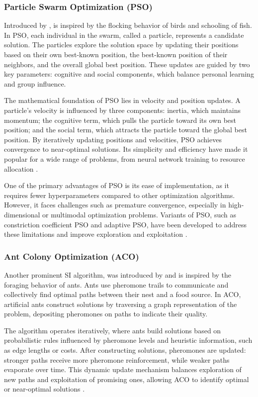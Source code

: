 \subsubsection{Particle Swarm Optimization (PSO)} Introduced by \textcite{kennedy1995particle}, is inspired by the flocking behavior of birds and schooling of fish. In PSO, each individual in the swarm, called a particle, represents a candidate solution. The particles explore the solution space by updating their positions based on their own best-known position, the best-known position of their neighbors, and the overall global best position. These updates are guided by two key parameters: cognitive and social components, which balance personal learning and group influence.

The mathematical foundation of PSO lies in velocity and position updates. A particle's velocity is influenced by three components: inertia, which maintains momentum; the cognitive term, which pulls the particle toward its own best position; and the social term, which attracts the particle toward the global best position. By iteratively updating positions and velocities, PSO achieves convergence to near-optimal solutions. Its simplicity and efficiency have made it popular for a wide range of problems, from neural network training to resource allocation \parencite{clerc2002particle}.

One of the primary advantages of PSO is its ease of implementation, as it requires fewer hyperparameters compared to other optimization algorithms. However, it faces challenges such as premature convergence, especially in high-dimensional or multimodal optimization problems. Variants of PSO, such as constriction coefficient PSO and adaptive PSO, have been developed to address these limitations and improve exploration and exploitation \parencite{shi1998modified}.

\subsubsection{Ant Colony Optimization (ACO)}
Another prominent SI algorithm, was introduced by \textcite{dorigo1996ant} and is inspired by the foraging behavior of ants. Ants use pheromone trails to communicate and collectively find optimal paths between their nest and a food source. In ACO, artificial ants construct solutions by traversing a graph representation of the problem, depositing pheromones on paths to indicate their quality.

The algorithm operates iteratively, where ants build solutions based on probabilistic rules influenced by pheromone levels and heuristic information, such as edge lengths or costs. After constructing solutions, pheromones are updated: stronger paths receive more pheromone reinforcement, while weaker paths evaporate over time. This dynamic update mechanism balances exploration of new paths and exploitation of promising ones, allowing ACO to identify optimal or near-optimal solutions \parencite{dorigo2007ant}.

